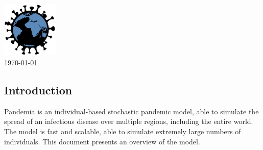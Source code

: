 \documentclass[10pt,letterpaper]{article}
\begin{document}
\vspace*{0.2in}

\begin{centering}
{\huge\textbf{}}
\\
\bigskip
\includegraphics[width=0.2\textwidth]{pandemia_logo}
\\
\bigskip
\today
\\
\end{centering}

\subsection*{Introduction}
Pandemia is an individual-based stochastic pandemic model, able to simulate the spread of an infectious disease over multiple regions, including the entire world. The model is fast and scalable, able to simulate extremely large numbers of individuals. This document presents an overview of the model.
\end{document}
